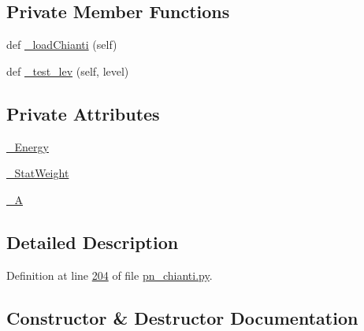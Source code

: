 \subsection*{Private Member Functions}
\begin{DoxyCompactItemize}
\item 
def \hyperlink{classpyneb_1_1utils_1_1pn__chianti_1_1___atom_chianti_a04653df9012e443155feef79b471d216}{\+\_\+load\+Chianti} (self)
\item 
def \hyperlink{classpyneb_1_1utils_1_1pn__chianti_1_1___atom_chianti_a551f0c33c7ebec76c0af9e86befd29f3}{\+\_\+test\+\_\+lev} (self, level)
\end{DoxyCompactItemize}
\subsection*{Private Attributes}
\begin{DoxyCompactItemize}
\item 
\hyperlink{classpyneb_1_1utils_1_1pn__chianti_1_1___atom_chianti_a7c9c9c75a6bacb0f6533e870cf556035}{\+\_\+\+Energy}
\item 
\hyperlink{classpyneb_1_1utils_1_1pn__chianti_1_1___atom_chianti_a8a718be321d05e4212ff5be195c92b42}{\+\_\+\+Stat\+Weight}
\item 
\hyperlink{classpyneb_1_1utils_1_1pn__chianti_1_1___atom_chianti_a4d531860236fc5a6564cc861b28cabe7}{\+\_\+\+A}
\end{DoxyCompactItemize}


\subsection{Detailed Description}


Definition at line \hyperlink{pn__chianti_8py_source_l00204}{204} of file \hyperlink{pn__chianti_8py_source}{pn\+\_\+chianti.\+py}.



\subsection{Constructor \& Destructor Documentation}
\hypertarget{classpyneb_1_1utils_1_1pn__chianti_1_1___atom_chianti_accfb95c4b9bdc734c43e40cc5d21c5c1}{}
